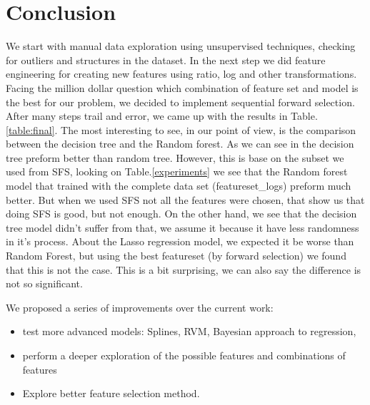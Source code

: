 \section{Conclusion}

We start with manual data exploration  using unsupervised techniques, checking for outliers and structures in the dataset. In the next step we did feature engineering for creating new features using ratio, log and other transformations. Facing the million dollar question which combination of feature set and model is the best for our problem, we decided to implement sequential forward selection. After many steps trail and error, we came up with the results in Table.\ref{table:final}. The most interesting to see, in our point of view, is the comparison between the decision tree and the Random forest. As we can see in the decision tree preform better than random tree. However, this is base on the subset we used from SFS, looking on Table.\ref{experiments} we see that the Random forest model that trained with the complete data set (featureset\_logs) preform much better. But when we used SFS not all the features were chosen, that show us that doing SFS is good, but not enough. On the other hand, we see that the decision tree model didn't suffer from that, we assume it because it have less randomness in it's process. About the Lasso regression model, we expected it be worse than Random Forest, but using the best featureset (by forward selection) we found that this is not the case. This is a bit surprising, we can also say the difference is not so significant.

% 



We proposed a series of improvements over the current work:
\begin{itemize}
    \item test more advanced models: Splines, RVM, Bayesian approach to regression,
    \item perform a deeper exploration of the possible features and combinations of features
    \item Explore better feature selection method.
\end{itemize}
